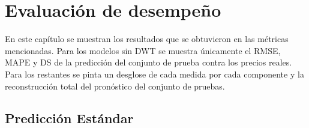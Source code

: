 \chapter{Evaluación de desempeño} 
\label{cap:evaluación de desempeño} 

En este capítulo se muestran los resultados que se obtuvieron en las métricas mencionadas. Para los modelos sin DWT se muestra únicamente el RMSE, MAPE y DS de la predicción del conjunto de prueba contra los precios reales. Para los restantes se pinta un desglose de cada medida por cada componente y la reconstrucción total del pronóstico del conjunto de pruebas.

\section{Predicción Estándar}

